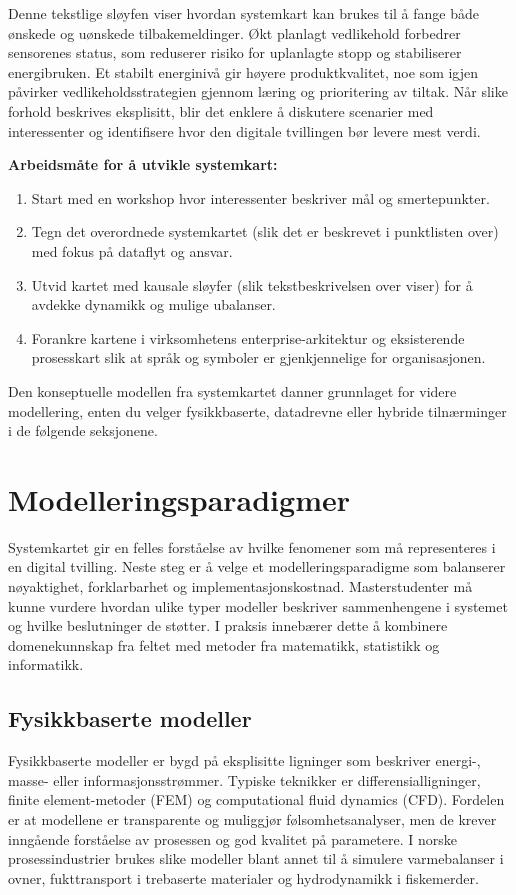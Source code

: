 Denne tekstlige sløyfen viser hvordan systemkart kan brukes til å fange både ønskede og uønskede tilbakemeldinger. Økt planlagt vedlikehold forbedrer sensorenes status, som reduserer risiko for uplanlagte stopp og stabiliserer energibruken. Et stabilt energinivå gir høyere produktkvalitet, noe som igjen påvirker vedlikeholdsstrategien gjennom læring og prioritering av tiltak. Når slike forhold beskrives eksplisitt, blir det enklere å diskutere scenarier med interessenter og identifisere hvor den digitale tvillingen bør levere mest verdi.

\textbf{Arbeidsmåte for å utvikle systemkart:}
\begin{enumerate}
    \item Start med en workshop hvor interessenter beskriver mål og smertepunkter.
    \item Tegn det overordnede systemkartet (slik det er beskrevet i punktlisten over) med fokus på dataflyt og ansvar.
    \item Utvid kartet med kausale sløyfer (slik tekstbeskrivelsen over viser) for å avdekke dynamikk og mulige ubalanser.
    \item Forankre kartene i virksomhetens enterprise-arkitektur og eksisterende prosesskart slik at språk og symboler er gjenkjennelige for organisasjonen.
\end{enumerate}

Den konseptuelle modellen fra systemkartet danner grunnlaget for videre modellering, enten du velger fysikkbaserte, datadrevne eller hybride tilnærminger i de følgende seksjonene.

\section{Modelleringsparadigmer}
Systemkartet gir en felles forståelse av hvilke fenomener som må representeres i en digital tvilling. Neste steg er å velge et
modelleringsparadigme som balanserer nøyaktighet, forklarbarhet og implementasjonskostnad. Masterstudenter må kunne vurdere
hvordan ulike typer modeller beskriver sammenhengene i systemet og hvilke beslutninger de støtter. I praksis innebærer dette å
kombinere domenekunnskap fra feltet med metoder fra matematikk, statistikk og informatikk.

\subsection{Fysikkbaserte modeller}
Fysikkbaserte modeller er bygd på eksplisitte ligninger som beskriver energi-, masse- eller informasjonsstrømmer. Typiske
teknikker er differensialligninger, finite element-metoder (FEM) og computational fluid dynamics (CFD). Fordelen er at
modellene er transparente og muliggjør følsomhetsanalyser, men de krever inngående forståelse av prosessen og god kvalitet på
parametere. I norske prosessindustrier brukes slike modeller blant annet til å simulere varmebalanser i ovner, fukttransport i
trebaserte materialer og hydrodynamikk i fiskemerder.


